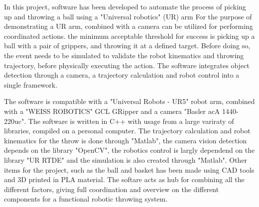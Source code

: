\label{sec:Abstract}

In this project, software has been developed to automate the process of picking up and throwing a ball using a "Universal robotics" (UR) arm
For the purpose of demonstrating a UR arm, combined with a camera can be utilized for performing coordinated actions.
the minimum acceptable threshold for success is picking up a ball with a pair of grippers, and throwing it at a defined target. 
Before doing so, the event needs to be simulated to validate the robot kinematics and throwing trajectory, before physically executing the action.
The software integrates object detection through a camera, a trajectory calculation and robot control into a single framework.

The software is compatible with a "Universal Robots - UR5" robot arm, combined with a "WEISS ROBOTICS" GCL GRipper and
a camera "Basler acA 1440-220uc". The software is written in C++ with usage from a large variraty of libraries, compiled on a personal computer.
The trajectory calculation and robot kinematics for the throw is done through "Matlab", the camera vision detection depends on the library "OpenCV", 
the robotics control is largly dependend on the library "UR RTDE" and the simulation is also created through "Matlab".
Other items for the project, such as the ball and basket has been made using CAD tools and 3D printed in PLA material.
The softare acts as hub for combining all the different factors, giving full coordination and overview on the different components for a functional robotic throwing system.